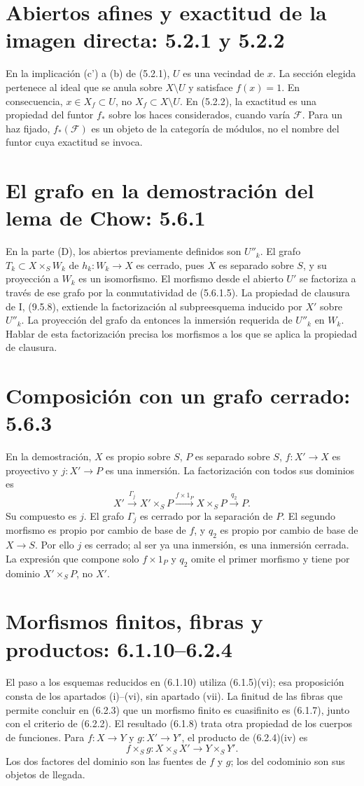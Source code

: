 \documentclass[11pt,a4paper]{article}
\begin{document}
\section{Abiertos afines y exactitud de la imagen directa: 5.2.1 y 5.2.2}
En la implicación (c') a (b) de (5.2.1), $U$ es una vecindad de $x$.
La sección elegida pertenece al ideal que se anula sobre $X\setminus U$
y satisface $f(x)=1$. En consecuencia,
$x\in X_f\subset U$, no $X_f\subset X\setminus U$.
En (5.2.2), la exactitud es una propiedad del funtor $f_*$ sobre
los haces considerados, cuando varía $\mathcal F$. Para un haz
fijado, $f_*(\mathcal F)$ es un objeto de la categoría de módulos,
no el nombre del funtor cuya exactitud se invoca.

\section{El grafo en la demostración del lema de Chow: 5.6.1}
En la parte (D), los abiertos previamente definidos son $U''_k$.
El grafo $T_k\subset X\times_S W_k$ de $h_k:W_k\to X$ es cerrado,
pues $X$ es separado sobre $S$, y su proyección a $W_k$ es un
isomorfismo. El morfismo desde el abierto $U'$ se factoriza a través
de ese grafo por la conmutatividad de (5.6.1.5).
La propiedad de clausura de I, (9.5.8), extiende la factorización
al subpreesquema inducido por $X'$ sobre $U''_k$. La proyección del
grafo da entonces la inmersión requerida de $U''_k$ en $W_k$.
Hablar de esta factorización precisa los morfismos a los que se
aplica la propiedad de clausura.

\section{Composición con un grafo cerrado: 5.6.3}
En la demostración, $X$ es propio sobre $S$, $P$ es separado sobre
$S$, $f:X'\to X$ es proyectivo y $j:X'\to P$ es una inmersión.
La factorización con todos sus dominios es
\[
X'\xrightarrow{\Gamma_j}X'\times_S P
\xrightarrow{f\times1_P}X\times_S P
\xrightarrow{q_2}P.
\]
Su compuesto es $j$. El grafo $\Gamma_j$ es cerrado por la
separación de $P$. El segundo morfismo es propio por cambio de
base de $f$, y $q_2$ es propio por cambio de base de $X\to S$.
Por ello $j$ es cerrado; al ser ya una inmersión, es una inmersión
cerrada. La expresión que compone solo $f\times1_P$ y $q_2$
omite el primer morfismo y tiene por dominio $X'\times_S P$,
no $X'$.

\section{Morfismos finitos, fibras y productos: 6.1.10--6.2.4}
El paso a los esquemas reducidos en (6.1.10) utiliza (6.1.5)(vi);
esa proposición consta de los apartados (i)--(vi), sin apartado (vii).
La finitud de las fibras que permite concluir en (6.2.3) que un
morfismo finito es cuasifinito es (6.1.7), junto con el criterio
de (6.2.2). El resultado (6.1.8) trata otra propiedad de los
cuerpos de funciones.
Para $f:X\to Y$ y $g:X'\to Y'$, el producto de (6.2.4)(iv) es
\[
f\times_S g:X\times_S X'\longrightarrow Y\times_S Y'.
\]
Los dos factores del dominio son las fuentes de $f$ y $g$;
los del codominio son sus objetos de llegada.
\end{document}
